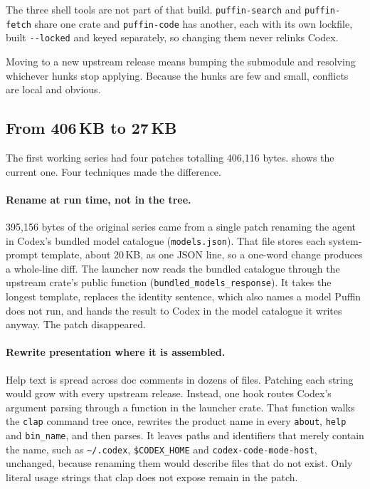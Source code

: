 \documentclass[11pt]{article}
\newcommand{\code}[1]{\texttt{#1}}
\begin{document}
The three shell tools are not part of that build. \code{puffin-search} and \code{puffin-fetch}
share one crate and \code{puffin-code} has another, each with its own lockfile, built
\code{-{}-locked} and keyed separately, so changing them never relinks Codex.

Moving to a new upstream release means bumping the submodule and resolving whichever hunks stop
applying. Because the hunks are few and small, conflicts are local and obvious.

\subsection{From 406\,KB to 27\,KB}

The first working series had four patches totalling 406{,}116 bytes.  shows the
current one. Four techniques made the difference.

\paragraph{Rename at run time, not in the tree.} 395{,}156 bytes of the original series came from a
single patch renaming the agent in Codex's bundled model catalogue (\code{models.json}). That file
stores each system-prompt template, about 20\,KB, as one JSON line, so a one-word change produces a
whole-line diff. The launcher now reads the bundled catalogue through the upstream crate's public
function (\code{bundled\_models\_response}). It takes the longest template, replaces the identity
sentence, which also names a model Puffin does not run, and hands the result to Codex in the model
catalogue it writes anyway. The patch disappeared.

\paragraph{Rewrite presentation where it is assembled.} Help text is spread across doc comments in
dozens of files. Patching each string would grow with every upstream release. Instead, one hook
routes Codex's argument parsing through a function in the launcher crate. That function walks the
\code{clap} command tree once, rewrites the product name in every \code{about}, \code{help} and
\code{bin\_name}, and then parses. It leaves paths and identifiers that merely contain the name,
such as \code{\textasciitilde/.codex}, \code{\$CODEX\_HOME} and \code{codex-code-mode-host}, unchanged,
because renaming them would describe files that do not exist. Only literal usage strings that clap
does not expose remain in the patch.
\end{document}
